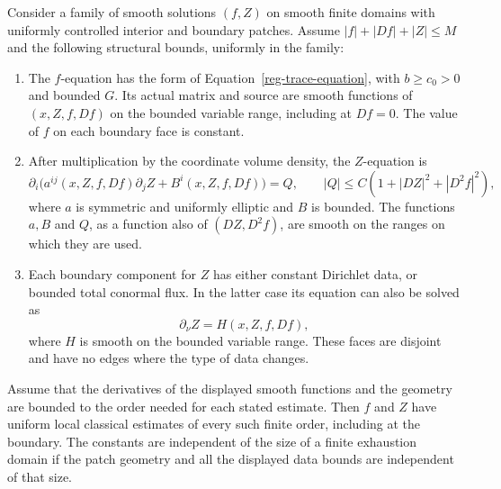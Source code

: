 \begin{proposition}
\label{reg-coupled-bootstrap}
Consider a family of smooth solutions $(f,Z)$ on smooth finite
domains with uniformly controlled interior and boundary patches.
Assume $|f|+|Df|+|Z|\le M$ and the following structural bounds,
uniformly in the family:
\begin{enumerate}[label=(\roman*)]
\item The $f$-equation has the form of
Equation~\eqref{reg-trace-equation}, with $b\ge c_0>0$ and
bounded $G$. Its actual matrix and source are smooth functions of
$(x,Z,f,Df)$ on the bounded variable range, including at $Df=0$.
The value of $f$ on each boundary face is constant.
\item After multiplication by the coordinate volume density, the
$Z$-equation is
\begin{equation}
 \partial_i\bigl(a^{ij}(x,Z,f,Df)\partial_jZ
                           +B^i(x,Z,f,Df)\bigr)=Q,
 \qquad
 |Q|\le C(1+|DZ|^2+|D^2f|^2),
 \label{reg-coupled-Z}
\end{equation}
where $a$ is symmetric and uniformly elliptic and $B$ is bounded.
The functions $a,B$ and $Q$, as a function also of $(DZ,D^2f)$,
are smooth on the ranges on which they are used.
\item Each boundary component for $Z$ has either constant
Dirichlet data, or bounded total conormal flux. In the latter case
its equation can also be solved as
\begin{equation}
 \partial_\nu Z=H(x,Z,f,Df),
 \label{reg-normal-data}
\end{equation}
where $H$ is smooth on the bounded variable range. These faces
are disjoint and have no edges where the type of data changes.
\end{enumerate}
Assume that the derivatives of the displayed smooth functions and
the geometry are bounded to the order needed for each stated
estimate. Then $f$ and $Z$ have uniform local classical estimates
of every such finite order, including at the boundary. The constants
are independent of the size of a finite exhaustion domain if the
patch geometry and all the displayed data bounds are independent
of that size.
\end{proposition}

